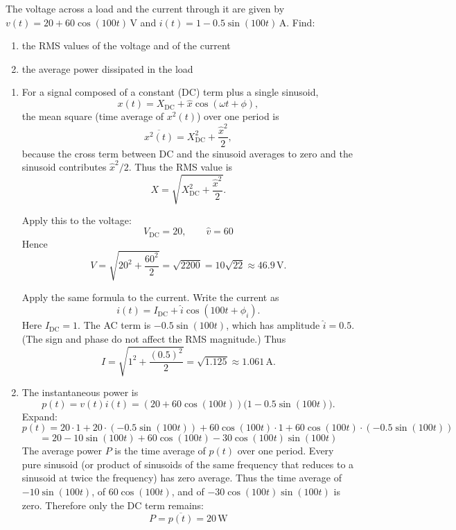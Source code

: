 \documentclass[11pt,a4paper]{article}
\newcounter{exercise}
\newenvironment{exercise}[1][]
  {\refstepcounter{exercise}%
   \begin{tcolorbox}[enhanced, breakable, width=\textwidth,
     colback=blue!5!white,colframe=blue!60!black,
     fonttitle=\bfseries\large,
     title=Exercise~\theexercise:~#1]}
  {\end{tcolorbox}}
\newif\ifshowsolutions
\newenvironment{solution}
  {\ifshowsolutions
     \begin{tcolorbox}[enhanced, breakable, width=\textwidth,
       colback=green!5!white,colframe=green!50!black,
       fonttitle=\bfseries\large,
       title=Solution]}
  {\end{tcolorbox}\fi}
\begin{document}
\begin{exercise}[RMS Values and Average Power]
The voltage across a load and the current through it are given by
$v(t)=20+60\cos(100t)\,\text{V}$ and $i(t)=1-0.5\sin(100t)\,\text{A}$.
Find:
\begin{enumerate}[label=\alph*)]
  \item the RMS values of the voltage and of the current
  \item the average power dissipated in the load
\end{enumerate}
\end{exercise}

\ifshowsolutions
\begin{solution}
\begin{enumerate}[label=\alph*)]
\item For a signal composed of a constant (DC) term plus a single sinusoid,
\[
x(t) = X_{\mathrm{DC}} + \hat{x} \cos(\omega t+\phi),
\]
the mean square (time average of \(x^2(t)\)) over one period is
\[
\overline{x^2(t)} = X_{\mathrm{DC}}^2 + \frac{\hat{x}^2}{2},
\]
because the cross term between DC and the sinusoid averages to zero and the sinusoid contributes \(\hat{x}^2/2\). Thus the RMS value is
\[
X = \sqrt{X_{\mathrm{DC}}^2 + \dfrac{\hat{x}^2}{2}}.
\]

Apply this to the voltage:
\[
V_{\mathrm{DC}} = 20,\qquad \hat{v} = 60
\]
Hence
\[
V = \sqrt{20^2 + \frac{60^2}{2}} = \sqrt{2200} = 10\sqrt{22} \approx 46.9\,\text{V}.
\]

Apply the same formula to the current. Write the current as
\[
i(t) = I_{\mathrm{DC}} + \hat{i} \cos(100t + \phi_i).
\]
Here \(I_{\mathrm{DC}} = 1\). The AC term is \(-0.5 \sin(100t)\), which has amplitude \(\hat{i} = 0.5\). (The sign and phase do not affect the RMS magnitude.) Thus
\[
I = \sqrt{1^2 + \frac{(0.5)^2}{2}} = \sqrt{1.125} \approx 1.061\,\text{A}.
\]

\item The instantaneous power is
\[
p(t) = v(t) i(t) = (20 + 60 \cos(100t))\bigl(1 - 0.5 \sin(100t)\bigr).
\]
Expand:
\[
p(t) = 20 \cdot 1 + 20 \cdot (-0.5 \sin(100t)) + 60 \cos(100t) \cdot 1 + 60 \cos(100t) \cdot (-0.5 \sin(100t))
\]
\[
= 20 - 10 \sin(100t) + 60 \cos(100t) - 30 \cos(100t) \sin(100t)
\]
The average power \(P\) is the time average of \(p(t)\) over one period. Every pure sinusoid (or product of sinusoids of the same frequency that reduces to a sinusoid at twice the frequency) has zero average. Thus the time average of \(-10 \sin(100t)\), of \(60 \cos(100t)\), and of \(-30 \cos(100t) \sin(100t)\) is zero. Therefore only the DC term remains:
\[
P = \overline{p(t)} = 20\,\text{W}
\]


\end{enumerate}
\end{solution}
\end{document}
